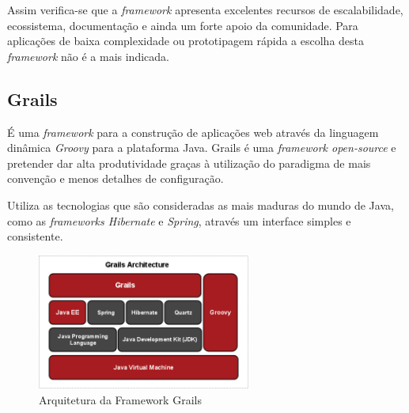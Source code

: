 Assim verifica-se que a \textit{framework} apresenta excelentes recursos de escalabilidade, ecossistema, documentação e ainda um forte apoio da comunidade. Para aplicações de baixa complexidade ou prototipagem rápida a escolha desta \textit{framework} não é a mais indicada.

\subsection{Grails}

É uma \textit{framework} para a construção de aplicações web através da linguagem dinâmica \textit{Groovy} para a plataforma Java. Grails é uma \textit{framework open-source} e pretender dar alta produtividade graças à utilização do paradigma de mais convenção e menos detalhes de configuração.

Utiliza as tecnologias que são consideradas as mais maduras do mundo de Java, como as \textit{frameworks Hibernate} e \textit{Spring}, através um interface simples e consistente.

\begin{figure}[ht!]
\centering
\includegraphics[width=70mm]{img/grails.png}
\caption{Arquitetura da Framework Grails}
\end{figure}


